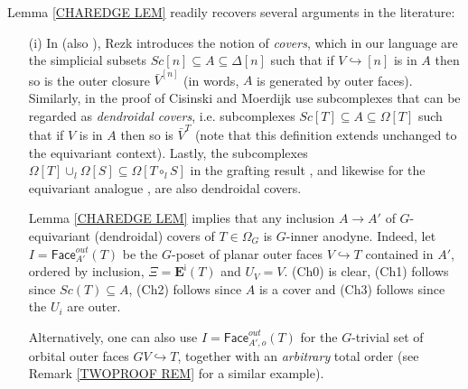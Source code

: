 \documentclass[a4paper,10pt
,draft
]{article}%
\begin{document}


\begin{remark} \label{RECOVER REM}
Lemma \ref{CHAREDGE LEM} readily recovers several arguments in the literature:
\begin{itemize}
\item[(i)] In \cite[\S 10]{Rez01} (also \cite[\S 6.2]{Rez10}), Rezk introduces the notion of \textit{covers}, which in our language are the simplicial subsets
$Sc[n] \subseteq A \subseteq \Delta[n]$
such that if $V \hookrightarrow [n]$ is in $A$ then so is the outer closure $\bar{V}^{[n]}$
(in words, $A$ is generated by outer faces).
Similarly, in the proof of \cite[Prop. 2.4]{CM13a}
Cisinski and Moerdijk use subcomplexes
that can be regarded as
\textit{dendroidal covers},
i.e. subcomplexes
$Sc[T] \subseteq A \subseteq \Omega[T]$
such that if $V$ is in $A$ then so is $\bar{V}^{T}$
(note that this definition extends unchanged to the equivariant context).
Lastly, the subcomplexes 
$\Omega[T] \cup_l \Omega[S] \subseteq \Omega[T \circ_l S]$
in the grafting result \cite[Lemma 5.2]{MW09},
and likewise for the equivariant analogue \cite[Prop. 6.19]{Per18}, are also dendroidal covers.

Lemma \ref{CHAREDGE LEM} implies
that any inclusion $A \to A'$ of $G$-equivariant (dendroidal) covers of $T\in \Omega_G$
is $G$-inner anodyne. 
Indeed, let $I=\mathsf{Face}_{A'}^{out}(T)$ be the $G$-poset of planar outer faces $V \hookrightarrow T$ contained in $A'$, ordered by inclusion, 
$\Xi = \boldsymbol{E}^{\mathsf{i}}(T)$ and $U_V = V$.
(Ch0) is clear, (Ch1) follows since 
$Sc(T) \subseteq A$, (Ch2) follows since $A$ is a cover and
(Ch3) follows since the $U_i$ are outer.

Alternatively, one can also use $I=\mathsf{Face}_{A',o}^{out}(T)$
for the $G$-trivial set of orbital outer faces 
$GV \hookrightarrow T$,
together with an \textit{arbitrary} total order (see Remark \ref{TWOPROOF REM} for a similar example).


\end{itemize}
\end{remark}
\end{document}
